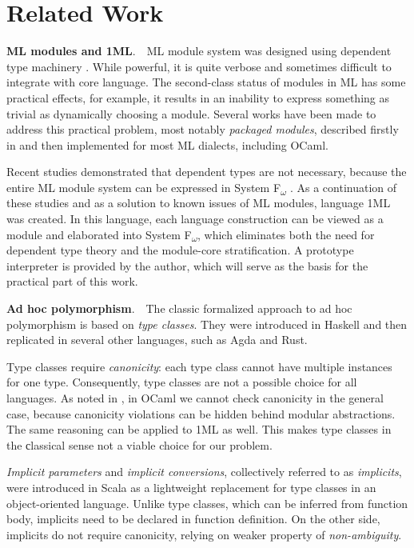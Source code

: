 \documentclass{spbau-diploma}
\begin{document}
\section{Related Work}

\textbf{ML modules and 1ML}.~~ML module system was designed using dependent type machinery \cite{dependent_types}. While powerful, it is quite verbose and sometimes difficult to integrate with core language. The second-class status of modules in ML has some practical effects, for example, it results in an inability to express something as trivial as dynamically choosing a module. Several works have been made to address this practical problem, most notably \textit{packaged modules}, described firstly in \cite{packaged} and then implemented for most ML dialects, including OCaml.

Recent studies demonstrated that dependent types are not necessary, because the entire ML module system can be expressed in System F\textsubscript{$\omega$} \cite{fing}. As a continuation of these studies and as a solution to known issues of ML modules, language 1ML \cite{1ml} was created. In this language, each language construction can be viewed as a module and elaborated into System F\textsubscript{$\omega$}, which eliminates both the need for dependent type theory and the module-core stratification. A prototype interpreter is provided by the author, which will serve as the basis for the practical part of this work.

\textbf{Ad hoc polymorphism}.~~The classic formalized approach to ad hoc polymorphism is based on \textit{type classes}. They were introduced in Haskell \cite{adhoc} and then replicated in several other languages, such as Agda and Rust. 

Type classes require \textit{canonicity}: each type class cannot have multiple instances for one type. Consequently, type classes are not a possible choice for all languages. As noted in \cite{white}, in OCaml we cannot check canonicity in the general case, because canonicity violations can be hidden behind modular abstractions. The same reasoning can be applied to 1ML as well. This makes type classes in the сlassical sense not a viable choice for our problem.

\textit{Implicit parameters} and \textit{implicit conversions}, collectively referred to as \textit{implicits}, were introduced in Scala \cite{implicits} as a lightweight replacement for type classes in an object-oriented language. Unlike type classes, which can be inferred from function body, implicits need to be declared in function definition. On the other side, implicits do not require canonicity, relying on weaker property of \textit{non-ambiguity}.
\end{document}

